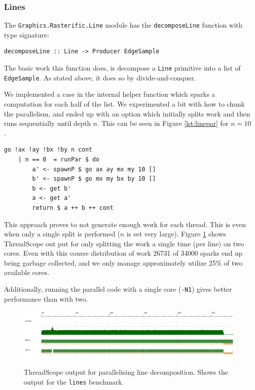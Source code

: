 \documentclass[12pt, a4paper]{article}
\begin{document}
\subsubsection{Lines}
The \texttt{Graphics.Rasterific.Line} module has the \texttt{decomposeLine} function with type
signature:
\begin{lstlisting}
decomposeLine :: Line -> Producer EdgeSample\end{lstlisting}
The basic work this function does, is decompose a \texttt{Line} primitive into a list of
\texttt{EdgeSample}. As stated above, it does so by divide-and-conquer.

We implemented a case in the internal helper function which sparks a computation for each half of the list.
We experimented a bit with how to chunk the parallelism, and ended up with an option which initially splits
 work and then runs sequentially until depth $n$. This can be seen in Figure \ref{lst:linepar} for $n=10$.
\begin{lstlisting}[caption={Naively splitting work in two parts every 10 levels of the recursion tree.}, label={lst:linepar}]
    go !ax !ay !bx !by n cont
    | n == 0  = runPar $ do
        a' <- spawnP $ go ax ay mx my 10 []
        b' <- spawnP $ go mx my bx by 10 []
        b <- get b'
        a <- get a'
        return $ a ++ b ++ cont
\end{lstlisting}
This approach proves to not generate enough work for each thread. This is even when only a single split
is performed ($n$ is set very large). Figure \ref{fig:line-thread} shows ThreadScope out put for only splitting the
work a single time (per line) on two cores. Even with this course distribution of work
26731 of 34000 sparks end up being garbage collected, and we only manage approximately utilize 25\% of two available
 cores.

Additionally, running the parallel code with a single core (\texttt{-N1}) gives better performance than with
two.
\begin{figure}[h!]
  \centering
  \includegraphics[width=0.85\linewidth]{../threadscope/lines/single-split}
  \caption{ThreadScope output for parallelising line decomposition. Shows the output for the
    \texttt{lines} benchmark.}
  \label{fig:line-thread}
\end{figure}
\end{document}
